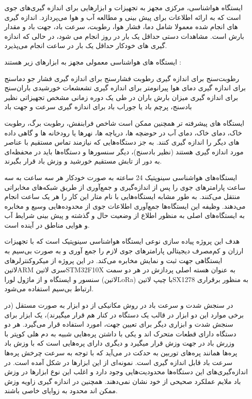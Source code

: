 ایستگاه هواشناسی، مرکزی مجهز به تجهیزات و ابزارهایی برای اندازه گیری‌های جوی است که به ارائه اطلاعات برای پیش بینی و مطالعه آب و هوا می‌پردازد. اندازه گیری های انجام شده معمولا شامل دما، فشار هوا، رطوبت، سرعت باد، جهت باد و مقدار بارش است. مشاهدات دستی حداقل یک بار در روز انجام می شود، در حالی که اندازه گیری های خودکار حداقل یک بار در ساعت انجام می‌پذیرد.

ایستگاه های هواشناسی معمولی مجهز به ابزارهای زیر هستند :

رطوبت‌سنج برای اندازه گیری رطوبت
فشارسنج برای اندازه گیری فشار جو
دماسنج برای اندازه گیری دمای هوا
پیرانومتر برای اندازه گیری تشعشعات خورشیدی
باران‌سنج برای اندازه گیری میزان بارش باران در طی یک دوره زمانی مشخص
تجهیزاتی نظیر بادسنج، پرچم باد یا جوراب باد برای اندازه گیری سرعت و جهت باد

ایستگاه های پیشرفته تر همچنین ممکن است شاخص فرابنفش، رطوبت برگ، رطوبت خاک، دمای خاک، دمای آب در حوضچه ها، دریاچه ها، نهرها یا رودخانه ها و گاهی داده های دیگر را اندازه گیری کنند. به جز دستگاه‌هایی که نیازمند تماس مستقیم با عناصر مورد اندازه گیری هستند (نظیر بادسنج)، دیگر سنسورها و دستگاه‌ها باید در محفظه‌ای به دور از تابش مستقیم خورشید و وزش باد قرار بگیرند.

ایستگاه‌های هواشناسی سینوپتیک 24 ساعته به صورت خودکار هر سه ساعت به سه ساعت پارامتر‌های جوی را پس از اندازه‌گیری و جمع‌آوری از طریق شبکه‌های مخابراتی منتقل می‌کنند. به طور مشابه ایستگاه‌هایی با نام متار این کار را هر  یک ساعت انجام‌ می‌دهند. وظیفه این ایستگاه‌ها جمع‌آوری اطلاعات جوی از محدوده‌هایی وسیع و مخابره به ایستگاه‌های اصلی به منظور اطلاع از وضعیت حال و گذشته و پیش بینی شرایط آب و هوایی مناطق در آینده است. 

هدف این پروژه پیاده سازی نوعی ایستگاه هواشناسی سینوپتیک است که با تجهیزات ارزان و کم‌مصرف دیجیتالی پارامتر‌های جوی لازم را جمع آوری و به صورت بی‌سیم به ایستگاهی جهت ثبت و نمایش مخابره می‌کند. در این پروژه از میکروکنترلرهای ‌لاتین{ARM} سری ‌لاتین{STM32F10X} به عنوان هسته اصلی پردازش در هر دو سمت سنسور و ایستگاه و از ماژول لورا (‌لاتین{LoRa}) با چیپ ‌لاتین{SX1278} به منظور برقراری ارتباط بی‌سیم استفاده می‌شود.

در سنجش شدت و سرعت باد در روش مکانیکی از دو ابزار به صورت مستقل (در برخی موارد این دو ابزار در قالب یک دستگاه در کنار هم قرار میگیرند)، یک ابزار برای سنجش شدت و ابزاری دیگر برای تعیین جهت، امورد استفاده قرار می‌گیرد. هر دو دستگاه دارای قطعات متحرک اند و یکی با داشتن پره‌هایی شبیه به دم هلی کوپتر با وزرش باد در جهت وزش قرار میگیرد و دیگری دارای پره‌هایی است که با وزش باد پره‌ها همانند پره‌های توربین به حدکت در می‌آید که با توجه به سرعت چرخش پره‌ها سرعت باد قابل اندازه‌ گیری است. نمونه‌ای از این ابزار‌ها در شکل  آمده است. در اندازه‌گیری‌های این دستگاه‌ها محدودیت‌هایی وجود دارد و اغلب این نوع ابزارها در وزش باد ملایم عملکرد صحیحی از خود نشان نمی‌دهند. همچنین در اندازه گیری زاویه وزش ممکن اند محدود به زوایای خاصی باشند. 

